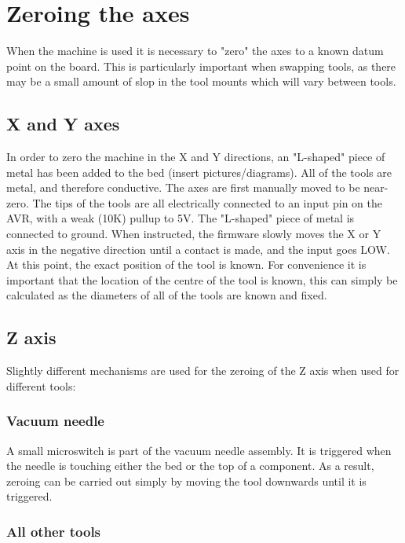 \documentclass[a4paper,11pt]{article}  %
\begin{document}
\section{Zeroing the axes}

When the machine is used it is necessary to "zero" the axes to a known datum point on the board. This is particularly important when swapping tools, as there may
be a small amount of slop in the tool mounts which will vary between tools.

\subsection{X and Y axes}

In order to zero the machine in the X and Y directions, an "L-shaped" piece of metal has been added to the bed (insert pictures/diagrams). All of the tools are metal,
and therefore conductive. The axes are first manually moved to be near-zero. The tips of the tools are all electrically connected to an input pin on the AVR, with a weak (10K) pullup to 5V.
The "L-shaped" piece of metal is connected to ground. When instructed, the firmware slowly moves the X or Y axis in the negative direction until a contact is made, and the input goes LOW. At this point,
the exact position of the tool is known. For convenience it is important that the location of the centre of the tool is known, this can simply be calculated as the diameters of all of the tools are known and fixed.

\subsection{Z axis}

Slightly different mechanisms are used for the zeroing of the Z axis when used for different tools:

\subsubsection{Vacuum needle}

A small microswitch is part of the vacuum needle assembly. It is triggered when the needle is touching either the bed or the top of a component. As a result, zeroing can be carried out simply by 
moving the tool downwards until it is triggered.

\subsubsection{All other tools}
\end{document}
